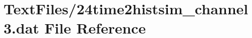 \hypertarget{24time2histsim__channel3_8dat}{}\section{Text\+Files/24time2histsim\+\_\+channel3.dat File Reference}
\label{24time2histsim__channel3_8dat}
